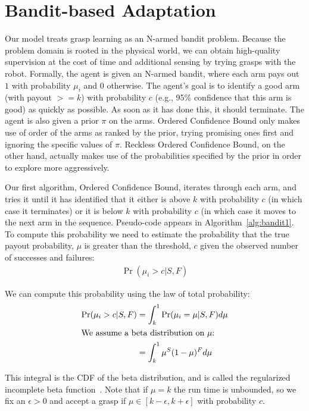 \documentclass{article}
\newcommand{\algorithmCTxt}{Ordered Confidence Bound\xspace}
\newcommand{\algorithmDTxt}{Reckless Ordered Confidence Bound\xspace}
\begin{document}
\section{Bandit-based Adaptation}

Our model treats grasp learning as an N-armed bandit problem. Because
the problem domain is rooted in the physical world, we can obtain
high-quality supervision at the cost of time and additional sensing by
trying grasps with the robot. Formally, the agent is given an N-armed
bandit, where each arm pays out $1$ with probability $\mu_i$ and $0$
otherwise.  The agent's goal is to identify a good arm (with payout
$>= k$) with probability $c$ (e.g., 95\% confidence that this arm is
good) as quickly as possible.  As soon as it has done this, it should
terminate.  The agent is also given a prior $\pi$ on the
arms. \algorithmCTxt only makes use of order of the arms as ranked by
the prior, trying promising ones first and ignoring the specific
values of $\pi$. \algorithmDTxt, on the other hand, actually makes use
of the probabilities specified by the prior in order to explore more
aggressively.


Our first algorithm, \algorithmCTxt, iterates through each arm, and tries it
until it has identified that it either is above $k$ with probability
$c$ (in which case it terminates) or it is below $k$ with probability
$c$ (in which case it moves to the next arm in the sequence.
Pseudo-code appears in Algorithm~\ref{alg:bandit1}.  To compute this
probability we need to estimate the probability that the true payout
probability, $\mu$ is greater than the threshold, $c$ given the
observed number of successes and failures:
\begin{align}
\Pr(\mu_i > c|  S, F)
\end{align}

We can compute this probability using the law of total probability:
\begin{align}
\Pr(\mu_i > c|  S, F) &= \int_k^1 \Pr(\mu_i=\mu | S, F) d\mu\\
\intertext{We assume a beta distribution on $\mu$:}
                      &= \int_k^1 \mu^S (1- \mu) ^F d\mu
\end{align}

This integral is the CDF of the beta distribution, and is called the
regularized incomplete beta function~\citep{olver10}.  Note that if
$\mu = k$ the run time is unbounded, so we fix an $\epsilon > 0$ and
accept a grasp if $\mu \in [k-\epsilon, k+\epsilon]$ with probability
$c$.
\end{document}
